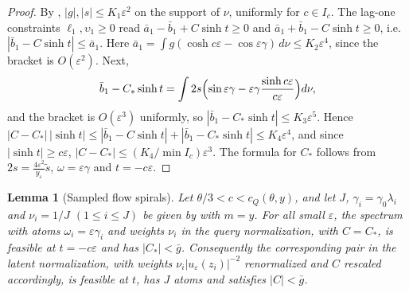 \documentclass[11pt]{article}
\newtheorem{lemma}[theorem]{Lemma}
\theoremstyle{definition}
\theoremstyle{remark}
\newcommand{\ch}{\cosh}
\newcommand{\sh}{\sinh}
\newcommand{\cQ}{c_{Q}}
\newcommand{\st}{\tilde s}
\begin{document}
\begin{proof}
By , \(|g|,|s|\le K_1\varepsilon^2\) on the support of \(\nu\), uniformly for \(c\in I_c\).
The lag-one constraints \(\ell_1,\upsilon_1\ge0\) read \(\bar a_1-\bar b_1+C\sh t\ge0\) and
\(\bar a_1+\bar b_1-C\sh t\ge0\), i.e.\ \(|\bar b_1-C\sh t|\le\bar a_1\).  Here
\(\bar a_1=\int g(\ch c\varepsilon-\cos\varepsilon\gamma)\,d\nu\le K_2\varepsilon^4\), since the bracket is \(O(\varepsilon^2)\).  Next,
\[
\bar b_1-C_*\sh t=\int2s\Bigl(\sin\varepsilon\gamma-\varepsilon\gamma\frac{\sh c\varepsilon}{c\varepsilon}\Bigr)d\nu ,
\]
and the bracket is \(O(\varepsilon^3)\) uniformly, so \(|\bar b_1-C_*\sh t|\le K_3\varepsilon^5\).  Hence
\(|C-C_*|\,|\sh t|\le|\bar b_1-C\sh t|+|\bar b_1-C_*\sh t|\le K_4\varepsilon^4\), and since \(|\sh t|\ge c\varepsilon\),
\(|C-C_*|\le(K_4/\min I_c)\varepsilon^3\).  The formula for \(C_*\) follows from
\(2s=\frac{4\varepsilon^2}{y_\varepsilon}\st\), \(\omega=\varepsilon\gamma\) and \(t=-c\varepsilon\).
\end{proof}

\begin{lemma}[Sampled flow spirals]\label{lem:flowspirals}
Let \(\theta/3<c<\cQ(\theta,y)\), and let \(J\), \(\gamma_i=\gamma_0\lambda_i\) and \(\nu_i=1/J\) \((1\le i\le J)\) be given by 
with \(m=y\).  For all small \(\varepsilon\), the spectrum with atoms \(\omega_i=\varepsilon\gamma_i\) and weights \(\nu_i\) in the query
normalization, with \(C=C_*\), is feasible at \(t=-c\varepsilon\) and has \(|C_*|<\bar g\).  Consequently the corresponding pair in the
latent normalization, with weights \(\nu_i|u_\varepsilon(z_i)|^{-2}\) renormalized and \(C\) rescaled accordingly, is feasible at \(t\),
has \(J\) atoms and satisfies \(|C|<\bar g\).
\end{lemma}
\end{document}
